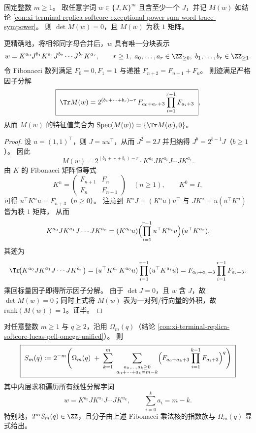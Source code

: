 \begin{conclusion}\label{con:xi-terminal-replica-softcore-jk-word-trace-fib-block-factorization}
固定整数 \(m\ge 1\)。
取任意字词 \(w\in\{J,K\}^m\) 且含至少一个 \(J\)，并记 \(M(w)\) 如结论 \ref{con:xi-terminal-replica-softcore-exceptional-power-sum-word-trace-sympower}。
则 \(\det M(w)=0\)，且 \(M(w)\) 为秩 \(1\) 矩阵。
\par
更精确地，将相邻同字母合并后，\(w\) 具有唯一分块表示
\[
w=K^{a_0}J^{b_1}K^{a_1}J^{b_2}\cdots J^{b_r}K^{a_r},
\qquad
r\ge 1,\ a_0,\dots,a_r\in\ZZ_{\ge 0},\ b_1,\dots,b_r\in\ZZ_{\ge 1}.
\]
令 Fibonacci 数列满足 \(F_0=0,F_1=1\) 与递推 \(F_{n+2}=F_{n+1}+F_n\)。
则迹满足严格因子分解
\[
\boxed{\;
\Tr M(w)
=2^{(b_1+\cdots+b_r)-r}\,F_{a_0+a_r+3}\prod_{i=1}^{r-1}F_{a_i+3}\;} ,
\]
从而 \(M(w)\) 的特征值集合为 \(\mathrm{Spec}(M(w))=\{\Tr M(w),0\}\)。
\end{conclusion}
\begin{proof}
设 \(u=(1,1)^{\top}\)，则 \(J=uu^{\top}\)，从而 \(J^2=2J\) 并归纳得
\(
J^{b}=2^{b-1}J
\)（\(b\ge 1\)）。
因此
\[
M(w)=2^{(b_1+\cdots+b_r)-r}\cdot K^{a_0}J K^{a_1}J\cdots J K^{a_r}.
\]
由 \(K\) 的 Fibonacci 矩阵恒等式
\[
K^n=
\begin{pmatrix}
F_{n+1}&F_n\\[2pt]
F_n&F_{n-1}
\end{pmatrix}\quad(n\ge 1),
\qquad
K^0=I,
\]
可得 \(u^{\top}K^n u=F_{n+3}\)（\(n\ge 0\)）。
注意到 \(K^{a}J=(K^{a}u)u^{\top}\) 与 \(JK^{a}=u(u^{\top}K^{a})\) 皆为秩 \(1\) 矩阵，
从而
\[
K^{a_0}J K^{a_1}J\cdots J K^{a_r}
=(K^{a_0}u)\Bigl(\prod_{i=1}^{r-1}u^{\top}K^{a_i}u\Bigr)(u^{\top}K^{a_r}),
\]
其迹为
\[
\Tr\!\bigl(K^{a_0}J K^{a_1}J\cdots J K^{a_r}\bigr)
=(u^{\top}K^{a_r}K^{a_0}u)\prod_{i=1}^{r-1}(u^{\top}K^{a_i}u)
=F_{a_0+a_r+3}\prod_{i=1}^{r-1}F_{a_i+3}.
\]
乘回标量因子即得所示因子分解。
由于 \(\det J=0\)，且 \(w\) 含 \(J\)，故 \(\det M(w)=0\)；同时上式将 \(M(w)\) 表为一对列/行向量的外积，故 \(\mathrm{rank}(M(w))=1\)。证毕。
\end{proof}
\begin{conclusion}\label{con:xi-terminal-replica-softcore-exceptional-power-sum-linear-word-closed-form}
对任意整数 \(m\ge 1\) 与 \(q\ge 2\)，沿用 \(\Omega_m(q)\)（结论 \ref{con:xi-terminal-replica-softcore-lucas-pell-omega-unified}）。
则
\[
\boxed{\;
S_m(q)
:=2^{-m}\Bigg(
\Omega_m(q)
\;+\;
\sum_{k=1}^{m}\ \sum_{\substack{a_0,\dots,a_k\ge 0\\ a_0+\cdots+a_k=m-k}}
\Bigl(F_{a_0+a_k+3}\prod_{i=1}^{k-1}F_{a_i+3}\Bigr)^q
\Bigg)\;}
\]
其中内层求和遍历所有线性分解字词
\[
w=K^{a_0}JK^{a_1}J\cdots JK^{a_k},
\qquad
\sum_{i=0}^{k}a_i=m-k.
\]
特别地，\(2^m S_m(q)\in\ZZ\)，且分子由上述 Fibonacci 乘法核的指数族与 \(\Omega_m(q)\) 显式给出。
\end{conclusion}
